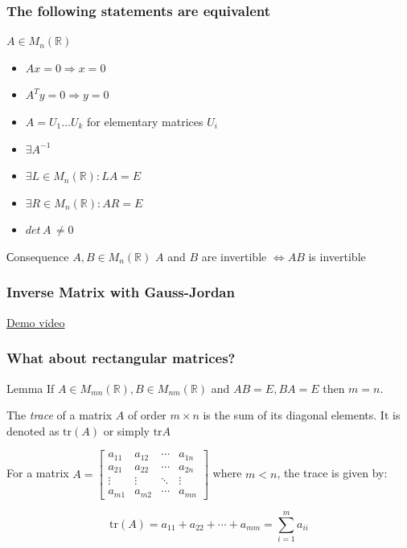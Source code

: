 \documentclass[fullscreen=true, bookmarks=true, hyperref={pdfencoding=unicode}]{beamer}
\begin{document}
\begin{frame}
  \frametitle{The following statements are equivalent}

  $A \in M_{n}(\mathbb{R})$

  \begin{itemize}
    \item $Ax = 0 \Rightarrow x = 0$
    \item $A^Ty = 0 \Rightarrow y = 0$
    \pause
    \item {\color{blue}$A = U_1\dots U_k$ for elementary matrices $U_i$}
    \pause
    \item $\exists A^{-1}$
    \item $\exists L \in M_{n}(\mathbb{R}): LA = E$
    \item $\exists R \in M_{n}(\mathbb{R}): AR = E$
    \pause
    \item {\color{gray}$det\, A\, \neq 0$}
  \end{itemize}

  \pause
  \begin{block}{Сonsequence}
    $A, B \in M_{n}(\mathbb{R})$ $A$ and $B$ are invertible $\Leftrightarrow AB$ is invertible
  \end{block}   
\end{frame}


\begin{frame}
  \frametitle{Inverse Matrix with Gauss-Jordan}

  \href{https://youtu.be/eDNrgT4qkls}{Demo video}  
\end{frame}


\begin{frame}
  \frametitle{What about rectangular matrices?}

  \begin{block}{Lemma}
    If $A \in M_{mn}(\mathbb{R}), B \in M_{nm}(\mathbb{R})$ 
    and $AB = E, BA = E$ then $m=n$.
  \end{block}

  \pause
  \begin{definition}
    The \emph{trace} of a matrix $A$ of order $m \times n$ 
    is the sum of its diagonal elements. 
    It is denoted as $\mathrm{tr}(A)$ or simply $\mathrm{tr} A$
  \end{definition}

  \begin{example}
    For a matrix $A = \begin{bmatrix}
      a_{11} & a_{12} & \cdots & a_{1n} \\
      a_{21} & a_{22} & \cdots & a_{2n} \\
      \vdots & \vdots & \ddots & \vdots \\
      a_{m1} & a_{m2} & \cdots & a_{mn}
    \end{bmatrix}$ where $m<n$, the trace is given by:

    \[
      \mathrm{tr}(A) = a_{11} + a_{22} + \cdots + a_{mm} = \sum_{i=1}^{m} a_{ii}
    \]
  \end{example}
\end{frame}
\end{document}
